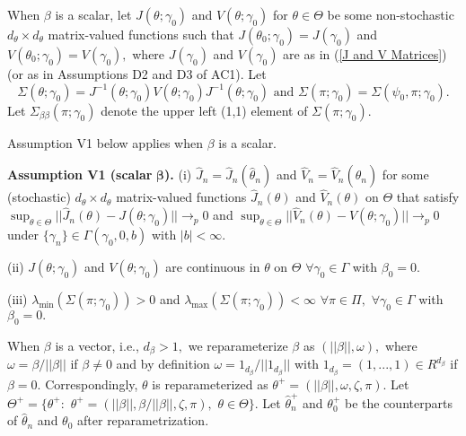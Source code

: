 \documentclass[12pt,thmsb,titlepage,final,oneside,letterpaper]{article}
\begin{document}
When $\beta $ is a scalar, let $J(\theta ;\gamma _{0})$ and $V(\theta
;\gamma _{0})$ for $\theta \in \Theta $ be some non-stochastic $d_{\theta
}\times d_{\theta }$ matrix-valued functions such that $J(\theta _{0};\gamma
_{0})=J(\gamma _{0})$ and $V(\theta _{0};\gamma _{0})=V(\gamma _{0}),$ where 
$J(\gamma _{0})$ and $V(\gamma _{0})$ are as in (\ref{J and V Matrices}) (or
as in Assumptions D2 and D3 of AC1). Let 
\begin{equation}
\Sigma (\theta ;\gamma _{0})=J^{-1}(\theta ;\gamma _{0})V(\theta ;\gamma
_{0})J^{-1}(\theta ;\gamma _{0})\text{ and }\Sigma (\pi ;\gamma _{0})=\Sigma
(\psi _{0},\pi ;\gamma _{0}).  \label{Sigma defn scalar beta}
\end{equation}%
Let $\Sigma _{\beta \beta }(\pi ;\gamma _{0})$ denote the upper left (1,1)
element of $\Sigma (\pi ;\gamma _{0}).$

Assumption V1 below applies when $\beta $ is a scalar.\medskip

\noindent \textbf{Assumption V1 (scalar }$\mathbf{\beta }$\textbf{). }(i) $%
\widehat{J}_{n}=\widehat{J}_{n}(\widehat{\theta }_{n})$ and $\widehat{V}_{n}=%
\widehat{V}_{n}(\widehat{\theta }_{n})$ for some (stochastic) $d_{\theta
}\times d_{\theta }$ matrix-valued functions $\widehat{J}_{n}(\theta )$ and $%
\widehat{V}_{n}(\theta )$ on $\Theta $ that satisfy $\sup_{\theta \in \Theta
}||\widehat{J}_{n}(\theta )-J(\theta ;\gamma _{0})||\rightarrow _{p}0$ and $%
\sup_{\theta \in \Theta }||\widehat{V}_{n}(\theta )-V(\theta ;\gamma
_{0})||\rightarrow _{p}0$ under $\{\gamma _{n}\}\in \Gamma (\gamma _{0},0,b)$
with $|b|<\infty .$

\noindent (ii) $J(\theta ;\gamma _{0})$ and $V(\theta ;\gamma _{0})$ are
continuous in $\theta $ on $\Theta $ $\forall \gamma _{0}\in \Gamma $ with $%
\beta _{0}=0.$

\noindent (iii) $\lambda _{\min }(\Sigma (\pi ;\gamma _{0}))>0$ and $\lambda
_{\max }(\Sigma (\pi ;\gamma _{0}))<\infty $ $\forall \pi \in \Pi ,$ $%
\forall \gamma _{0}\in \Gamma $ with $\beta _{0}=0.$\medskip

When $\beta $ is a vector, i.e., $d_{\beta }>1,$ we reparameterize $\beta $
as $(||\beta ||,\omega ),$ where $\omega =\beta /||\beta ||$ if $\beta \neq
0 $ and by definition $\omega =1_{d_{\beta }}/||1_{d_{\beta }}||$ with $%
1_{d_{\beta }}=(1,...,1)\in R^{d_{\beta }}$ if $\beta =0.$ Correspondingly, $%
\theta $ is reparameterized as $\theta ^{+}=(||\beta ||,\omega ,\zeta ,\pi
). $ Let $\Theta ^{+}=\{\theta ^{+}:$ $\theta ^{+}=(||\beta ||,\beta
/||\beta ||,\zeta ,\pi ),$ $\theta \in \Theta \}.$ Let $\widehat{\theta }%
_{n}^{+}$ and $\theta _{0}^{+}$ be the counterparts of $\widehat{\theta }%
_{n} $ and $\theta _{0}$ after reparametrization.
\end{document}

